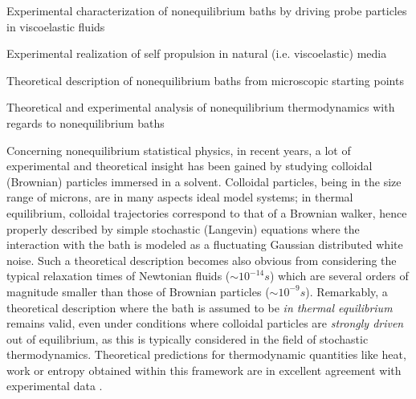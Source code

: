\begin{workpackage}[id=WPbrown,wphases=0-48,
  short=Brown. particles, %
  title=Brownian particles in nonequilibrium baths, %
  lead=USTUTT,
  USTUTTRM=96,KULRM=6,ULEIRM=6,UNIPDRM=6]

\newrefsection

\begin{wpobjectives}
\begin{compactitem}
\item Experimental characterization of nonequilibrium baths by driving probe particles in viscoelastic fluids
\item Experimental realization of self propulsion in natural (i.e. viscoelastic) media
\item Theoretical description of nonequilibrium baths from microscopic starting points
\item Theoretical and experimental analysis of nonequilibrium thermodynamics with regards to nonequilibrium baths
  \end{compactitem}
\end{wpobjectives}

\begin{wpdescription}

Concerning nonequilibrium statistical physics, in recent years, a lot of experimental and
theoretical insight has been gained by studying colloidal (Brownian) particles immersed in a solvent.
Colloidal particles, being in the size range of microns, are in many aspects ideal
model systems; in thermal equilibrium, colloidal trajectories correspond to that of a Brownian walker, hence properly described by
simple stochastic (Langevin) equations where the interaction with the bath is modeled as a fluctuating Gaussian distributed white noise. 
Such a theoretical description becomes also obvious from considering the typical relaxation times of Newtonian fluids ($\sim 10^{-14} s$) which are several orders of magnitude 
smaller than those of Brownian particles ($\sim 10^{-9} s$). Remarkably, a theoretical description where the bath is assumed to be {\it in thermal equilibrium} remains valid, even under conditions where colloidal particles are {\it strongly driven} out of equilibrium, as this is typically considered in the field of stochastic thermodynamics. Theoretical predictions for thermodynamic quantities like heat, work or entropy obtained within this framework are in excellent agreement with experimental data \cite{blickle2006, blickle2007, blickle2012}.



\end{wpdescription}
\end{workpackage}
